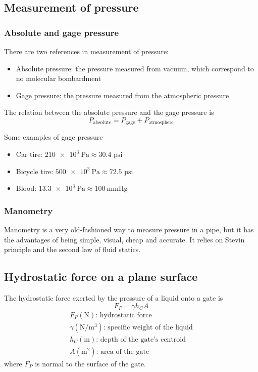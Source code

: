 \documentclass[10pt, twocolumn]{article}
\begin{document}
\subsection{Measurement of pressure}
\subsubsection*{Absolute and gage pressure}
There are two references in measurement of pressure:
\begin{itemize}
  \item Absolute pressure: the pressure measured from vacuum, which correspond to no molecular bombardment
  \item Gage pressure: the pressure measured from the atmospheric pressure
\end{itemize}

The relation between the absolute pressure and the gage pressure is
\[
  P_\mathrm{absolute} = P_\mathrm{gage} + P_\mathrm{atmosphere}
\]

\begin{example}
  Some examples of gage pressure
  \begin{itemize}
    \item Car tire: \(\SI[scientific-notation = false]{210 e+3}{\pascal}\approx 30.4 \text{ psi}\)
    \item Bicycle tire: \(\SI[scientific-notation = false]{500 e+3}{\pascal}\approx 72.5 \text{ psi}\)
    \item Blood: \(\SI[scientific-notation = false]{13.3 e+3}{\pascal} \approx \SI{100}{\mmHg}\)
  \end{itemize}
\end{example}

\subsubsection*{Manometry}
Manometry is a very old-fashioned way to measure pressure in a pipe, but it has the advantages of being simple, visual, cheap and accurate.
It relies on Stevin principle and the second law of fluid statics.

\subsection{Hydrostatic force on a plane surface}
The hydrostatic force exerted by the pressure of a liquid onto a gate is
\[
  F_P = \gamma h_C A
\]
\[
  \begin{array}{|l}
    F_P (\si{\newton}) \text{: hydrostatic force}                                \\
    \gamma (\si{\newton\per\metre\cubed}) \text{: specific weight of the liquid} \\
    h_C (\si{\metre}) \text{: depth of the gate's centroid}                      \\
    A (\si{\metre\squared}) \text{: area of the gate}
  \end{array}
\]
where \(F_P\) is normal to the surface of the gate.
\end{document}
